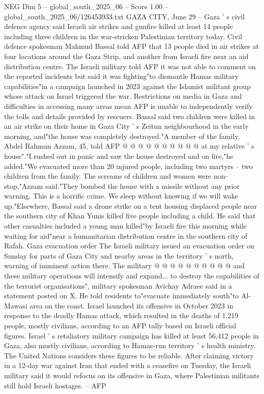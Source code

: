 \begin{textsample}{NEG Dim 5 – global\_south\_2025\_06 – Score 1.00 – global\_south\_2025\_06/126453933.txt}  \label{ex:f5_neg_393}
GAZA CITY, June 29 -- Gaza ' s civil defence agency said Israeli air strikes and gunfire killed at least 14 people including three children in the war-stricken Palestinian territory today.
Civil defence spokesman Mahmud Bassal told AFP that 13 people died in air strikes at four locations around the Gaza Strip, and another from Israeli fire near an aid distribution centre.
The Israeli military told AFP it was not able to comment on the reported incidents but said it was fighting"to dismantle Hamas military capabilities"in a campaign launched in 2023 against the Islamist militant group whose attack on Israel triggered the war.
Restrictions on media in Gaza and difficulties in accessing many areas mean AFP is unable to independently verify the tolls and details provided by rescuers.
Bassal said two children were killed in an air strike on their home in Gaza City ' s Zeitun neighbourhood in the early morning, and"the house was completely destroyed."A member of the family, Abdel Rahman Azzam, 45, told AFP @ @ @ @ @ @ @ @ @ @ at my relative ' s house"."I rushed out in panic and saw the house destroyed and on fire,"he added."We evacuated more than 20 injured people, including two martyrs -- two children from the family.
The screams of children and women were non-stop,"Azzam said."They bombed the house with a missile without any prior warning.
This is a horrific crime.
We sleep without knowing if we will wake up."Elsewhere, Bassal said a drone strike on a tent housing displaced people near the southern city of Khan Yunis killed five people including a child.
He said that other casualties included a young man killed"by Israeli fire this morning while waiting for aid"near a humanitarian distribution centre in the southern city of Rafah.
Gaza evacuation order The Israeli military issued an evacuation order on Sunday for parts of Gaza City and nearby areas in the territory ' s north, warning of imminent action there.
The military @ @ @ @ @ @ @ @ @ @ and these military operations will intensify and expand... to destroy the capabilities of the terrorist organisations", military spokesman Avichay Adraee said in a statement posted on X.
He told residents to"evacuate immediately south"to Al-Mawasi area on the coast.
Israel launched its offensive in October 2023 in response to the deadly Hamas attack, which resulted in the deaths of 1,219 people, mostly civilians, according to an AFP tally based on Israeli official figures.
Israel ' s retaliatory military campaign has killed at least 56,412 people in Gaza, also mostly civilians, according to Hamas-run territory ' s health ministry.
The United Nations considers these figures to be reliable.
After claiming victory in a 12-day war against Iran that ended with a ceasefire on Tuesday, the Israeli military said it would refocus on its offensive in Gaza, where Palestinian militants still hold Israeli hostages. -- AFP

\end{textsample}
